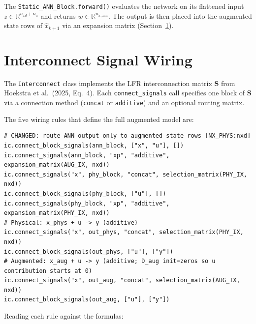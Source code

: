 \documentclass[11pt,a4paper]{article}
\newcommand{\code}[1]{\texttt{#1}}
\newcommand{\codetitle}[2]{\small\texttt{#1}\quad lines #2}
\begin{document}
The \code{Static\_ANN\_Block.forward()} evaluates the network on its
flattened input $z \in \mathbb{R}^{n_{xd}+n_u}$ and returns $w \in \mathbb{R}^{n_{x,\mathrm{ann}}}$.
The output is then placed into the augmented state rows of
$\hat{x}_{k+1}$ via an expansion matrix (Section~\ref{sec:wiring}).

\section{Interconnect Signal Wiring}
\label{sec:wiring}

The \code{Interconnect} class implements the LFR interconnection matrix
$\mathbf{S}$ from Hoekstra et al.\ (2025, Eq.\ 4).
Each \code{connect\_signals} call specifies one block of $\mathbf{S}$
via a connection method (\texttt{concat} or \texttt{additive}) and
an optional routing matrix.

The five wiring rules that define the full augmented model are:

\begin{lstlisting}[style=py,
  title={\codetitle{gantry\_interconnect\_dynamic.py}{265--275}},
  firstnumber=265]
# CHANGED: route ANN output only to augmented state rows [NX_PHYS:nxd]
ic.connect_block_signals(ann_block, ["x", "u"], [])
ic.connect_signals(ann_block, "xp", "additive", expansion_matrix(AUG_IX, nxd))
ic.connect_signals("x", phy_block, "concat", selection_matrix(PHY_IX, nxd))
ic.connect_block_signals(phy_block, ["u"], [])
ic.connect_signals(phy_block, "xp", "additive", expansion_matrix(PHY_IX, nxd))
# Physical: x_phys + u -> y (additive)
ic.connect_signals("x", out_phys, "concat", selection_matrix(PHY_IX, nxd))
ic.connect_block_signals(out_phys, ["u"], ["y"])
# Augmented: x_aug + u -> y (additive; D_aug init=zeros so u contribution starts at 0)
ic.connect_signals("x", out_aug, "concat", selection_matrix(AUG_IX, nxd))
ic.connect_block_signals(out_aug, ["u"], ["y"])
\end{lstlisting}

Reading each rule against the formulas:
\end{document}
